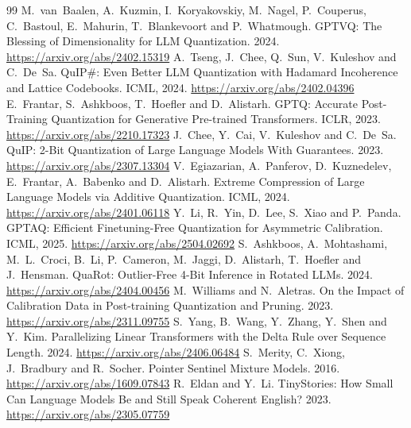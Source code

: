 \documentclass[11pt]{article}
\begin{document}
\begingroup
\small
\setlength{\itemsep}{1pt plus 0.3ex}
\begin{thebibliography}{99}
\setlength{\itemsep}{1pt plus 0.3ex}
\setlength{\parskip}{0pt}
 M.~van~Baalen, A.~Kuzmin, I.~Koryakovskiy, M.~Nagel,
  P.~Couperus, C.~Bastoul, E.~Mahurin, T.~Blankevoort and P.~Whatmough. GPTVQ:
  The Blessing of Dimensionality for LLM Quantization. 2024.
  \url{https://arxiv.org/abs/2402.15319}
 A.~Tseng, J.~Chee, Q.~Sun, V.~Kuleshov and C.~De~Sa.
  QuIP\#: Even Better LLM Quantization with Hadamard Incoherence and Lattice
  Codebooks. ICML, 2024. \url{https://arxiv.org/abs/2402.04396}
 E.~Frantar, S.~Ashkboos, T.~Hoefler and D.~Alistarh. GPTQ:
  Accurate Post-Training Quantization for Generative Pre-trained Transformers.
  ICLR, 2023. \url{https://arxiv.org/abs/2210.17323}
 J.~Chee, Y.~Cai, V.~Kuleshov and C.~De~Sa. QuIP: 2-Bit
  Quantization of Large Language Models With Guarantees. 2023.
  \url{https://arxiv.org/abs/2307.13304}
 V.~Egiazarian, A.~Panferov, D.~Kuznedelev, E.~Frantar,
  A.~Babenko and D.~Alistarh. Extreme Compression of Large Language Models via
  Additive Quantization. ICML, 2024. \url{https://arxiv.org/abs/2401.06118}
 Y.~Li, R.~Yin, D.~Lee, S.~Xiao and P.~Panda. GPTAQ: Efficient
  Finetuning-Free Quantization for Asymmetric Calibration. ICML, 2025.
  \url{https://arxiv.org/abs/2504.02692}
 S.~Ashkboos, A.~Mohtashami, M.~L.~Croci, B.~Li, P.~Cameron,
  M.~Jaggi, D.~Alistarh, T.~Hoefler and J.~Hensman. QuaRot: Outlier-Free 4-Bit
  Inference in Rotated LLMs. 2024. \url{https://arxiv.org/abs/2404.00456}
 M.~Williams and N.~Aletras. On the Impact of Calibration
  Data in Post-training Quantization and Pruning. 2023.
  \url{https://arxiv.org/abs/2311.09755}
 S.~Yang, B.~Wang, Y.~Zhang, Y.~Shen and Y.~Kim.
  Parallelizing Linear Transformers with the Delta Rule over Sequence Length.
  2024. \url{https://arxiv.org/abs/2406.06484}
 S.~Merity, C.~Xiong, J.~Bradbury and R.~Socher. Pointer
  Sentinel Mixture Models. 2016. \url{https://arxiv.org/abs/1609.07843}
 R.~Eldan and Y.~Li. TinyStories: How Small Can Language
  Models Be and Still Speak Coherent English? 2023.
  \url{https://arxiv.org/abs/2305.07759}
\end{thebibliography}
\endgroup
\end{document}
